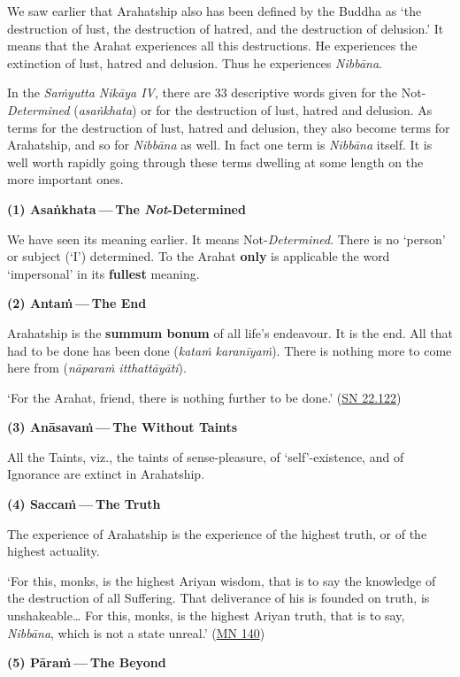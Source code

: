 We saw earlier that Arahatship also has been defined by the Buddha as `the destruction of lust, the destruction of hatred, and the destruction of delusion.' It means that the Arahat experiences all this destructions. He experiences the extinction of lust, hatred and delusion. Thus he experiences \emph{Nibbāna}.

In the \emph{Saṁyutta Nikāya IV}, there are 33 descriptive words given for the Not-\emph{Determined} (\emph{asaṅkhata}) or for the destruction of lust, hatred and delusion. As terms for the destruction of lust, hatred and delusion, they also become terms for Arahatship, and so for \emph{Nibbāna} as well. In fact one term is \emph{Nibbāna} itself. It is well worth rapidly going through these terms dwelling at some length on the more important ones.

\textbf{(1) Asaṅkhata --- The \emph{Not}-Determined}

We have seen its meaning earlier. It means Not-\emph{Determined}. There is no `person' or subject (`I') determined. To the Arahat \textbf{only} is applicable the word `impersonal' in its \textbf{fullest} meaning.

\textbf{(2) Antaṁ --- The End}

Arahatship is the \textbf{summum bonum} of all life's endeavour. It is the end. All that had to be done has been done (\emph{kataṁ karanīyaṁ}). There is nothing more to come here from (\emph{nāparaṁ itthattāyāti}).

`For the Arahat, friend, there is nothing further to be done.' (\href{https://suttacentral.net/sn22.122/en/suddhaso}{SN 22.122})

\textbf{(3) Anāsavaṁ --- The Without Taints}

All the Taints, viz., the taints of sense-pleasure, of `self'-existence, and of Ignorance are extinct in Arahatship.

\textbf{(4) Saccaṁ --- The Truth}

The experience of Arahatship is the experience of the highest truth, or of the highest actuality.

`For this, monks, is the highest Ariyan wisdom, that is to say the knowledge of the destruction of all Suffering. That deliverance of his is founded on truth, is unshakeable\ldots\hspace{0pt} For this, monks, is the highest Ariyan truth, that is to say, \emph{Nibbāna}, which is not a state unreal.' (\href{https://suttacentral.net/mn140/en/bodhi}{MN 140})

\textbf{(5) Pāraṁ --- The Beyond}

